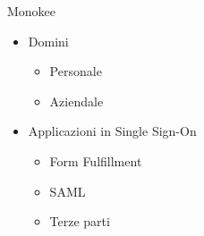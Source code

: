 \begin{tframe}{Monokee}
\begin{center}
\end{center}

\begin{itemize}
\item Domini
	\begin{itemize}
	\item Personale
	\item Aziendale
	\end{itemize}
\item Applicazioni in Single Sign-On
	\begin{itemize}
	\item Form Fulfillment
	\item SAML
	\item Terze parti
	\end{itemize}
\end{itemize}

\end{tframe}